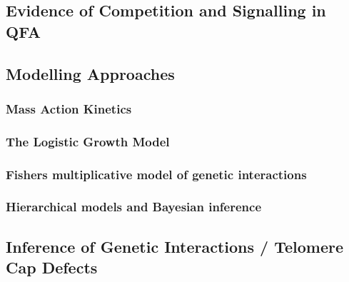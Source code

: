 \subsection{Evidence of Competition and Signalling in QFA}

\subsection{Modelling Approaches}

\subsubsection{Mass Action Kinetics}
\subsubsection{The Logistic Growth Model}
\subsubsection{Fishers multiplicative model of genetic interactions}
\subsubsection{Hierarchical models and Bayesian inference}

\subsection{Inference of Genetic Interactions / Telomere Cap Defects}


